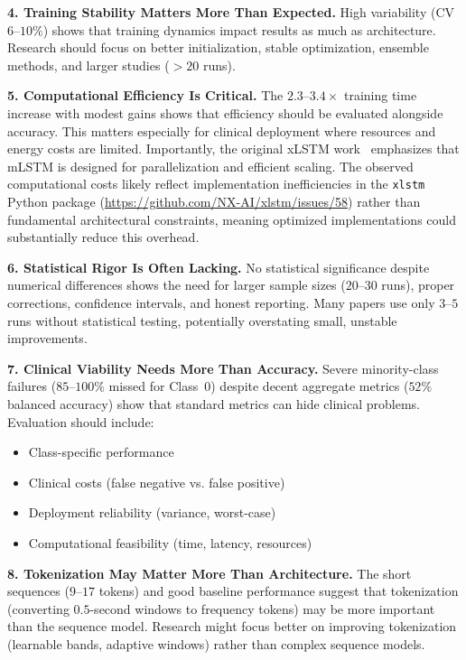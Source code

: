 \textbf{4. Training Stability Matters More Than Expected.} High variability (CV $6$--$10\%$) shows that training dynamics impact results as much as architecture. Research should focus on better initialization, stable optimization, ensemble methods, and larger studies ($>20$ runs).

\textbf{5. Computational Efficiency Is Critical.} The $2.3$--$3.4\times$ training time increase with modest gains shows that efficiency should be evaluated alongside accuracy. This matters especially for clinical deployment where resources and energy costs are limited. Importantly, the original \ac{xLSTM} work~\cite{beck2024xlstm} emphasizes that \ac{mLSTM} is designed for parallelization and efficient scaling. The observed computational costs likely reflect implementation inefficiencies in the \texttt{xlstm} Python package (\url{https://github.com/NX-AI/xlstm/issues/58}) rather than fundamental architectural constraints, meaning optimized implementations could substantially reduce this overhead.

\textbf{6. Statistical Rigor Is Often Lacking.} No statistical significance despite numerical differences shows the need for larger sample sizes ($20$--$30$ runs), proper corrections, confidence intervals, and honest reporting. Many papers use only $3$--$5$ runs without statistical testing, potentially overstating small, unstable improvements.

\textbf{7. Clinical Viability Needs More Than Accuracy.} Severe minority-class failures ($85$--$100\%$ missed for Class~0) despite decent aggregate metrics ($52\%$ balanced accuracy) show that standard metrics can hide clinical problems. Evaluation should include:
\begin{itemize}
    \item Class-specific performance
    \item Clinical costs (false negative vs. false positive)
    \item Deployment reliability (variance, worst-case)
    \item Computational feasibility (time, latency, resources)
\end{itemize}

\textbf{8. Tokenization May Matter More Than Architecture.} The short sequences ($9$--$17$ tokens) and good baseline performance suggest that tokenization (converting $0.5$-second windows to frequency tokens) may be more important than the sequence model. Research might focus better on improving tokenization (learnable bands, adaptive windows) rather than complex sequence models.

